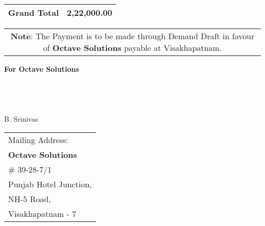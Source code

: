 \documentclass[11pt]{article}
\begin{document}
\vspace*{0.5cm}

\hspace*{12.4cm}
\begin{tabular}{|c|r|}
\hline
{\bf Grand Total} & 2,22,000.00 \\
\hline
\end{tabular}

\vspace*{-0.4cm}
\begin{tabular}{c}
\parbox{4in}{ {\bf Note}: The Payment is to be made through Demand Draft in favour of {\bf Octave Solutions} payable at Visakhapatnam. }\\
\end{tabular}
\vspace*{55pt}


{\bf For  Octave Solutions } \\ \\ \\ \\ \\
 \hspace*{0.6cm}B. Srinivas
\vspace*{-71pt}
\begin{flushright}
\begin{tabular}{l}
Mailing Address:\\
{\bf Octave Solutions}\\
\# 39-28-7/1\\
Punjab Hotel Junction, \\ 
NH-5 Road, \\
Visakhapatnam - 7\\
\end{tabular}
\end{flushright}
\end{document}
